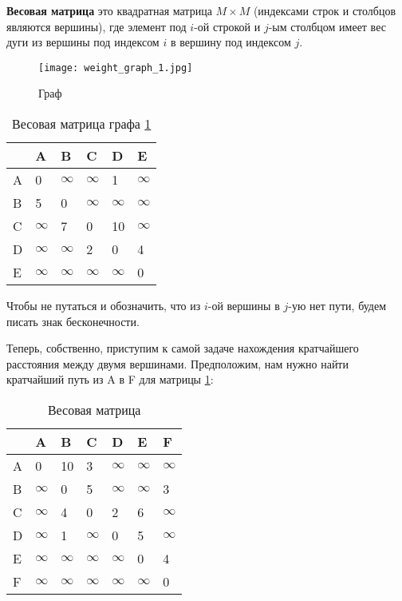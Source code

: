 \textbf{Весовая матрица} это квадратная матрица $M \times M$
(индексами строк и столбцов являются вершины), где элемент под $i$-ой строкой и $j$-ым столбцом имеет вес дуги из вершины
под индексом $i$ в вершину под индексом $j$.
\begin{figure}[!h]
    \centering 
    \texttt{[image: weight\_graph\_1.jpg]}
    \caption{Граф}
    \label{weight_graph}
\end{figure}

\begin{table}[h]
    \centering
    \begin{tabular}[c]{ | l | l | l | l | l | l | }
        \hline
          & A & B & C & D & E \\ \hline
        A & 0 & $\infty$ & $\infty$ & 1 & $\infty$ \\ \hline
        B & 5 & 0 & $\infty$ & $\infty$ & $\infty$ \\ \hline
        C & $\infty$ & 7 & 0 & 10 & $\infty$ \\ \hline
        D & $\infty$ & $\infty$ & 2 & 0 & 4 \\ \hline
        E & $\infty$ & $\infty$ & $\infty$ & $\infty$ & 0 \\
        \hline
    \end{tabular}
    \caption{Весовая матрица графа \ref{weight_graph}}
\end{table}
Чтобы не путаться и обозначить, что из $i$-ой вершины в $j$-ую нет пути, будем писать знак 
бесконечности.

Теперь, собственно, приступим к самой задаче нахождения кратчайшего расстояния между двумя вершинами.
Предположим, нам нужно найти кратчайший путь из A в F для матрицы \ref{weight_matrix}:
\begin{table}[h]
    \centering
    \begin{tabular}[c]{ | l | l | l | l | l | l | l | }
        \hline
          & A & B & C & D & E & F \\ \hline
        A & 0 & 10 & 3 & $\infty$ & $\infty$ & $\infty$ \\ \hline
        B & $\infty$ & 0 & 5 & $\infty$ & $\infty$ & 3 \\ \hline
        C & $\infty$ & 4 & 0 & 2 & 6 & $\infty$ \\ \hline
        D & $\infty$ & 1 & $\infty$ & 0 & 5 & $\infty$ \\ \hline
        E & $\infty$ & $\infty$ & $\infty$ & $\infty$ & 0 & 4 \\ \hline
        F & $\infty$ & $\infty$ & $\infty$ & $\infty$ & $\infty$ & 0 \\
        \hline
    \end{tabular}
    \caption{Весовая матрица}
    \label{weight_matrix}
\end{table}

